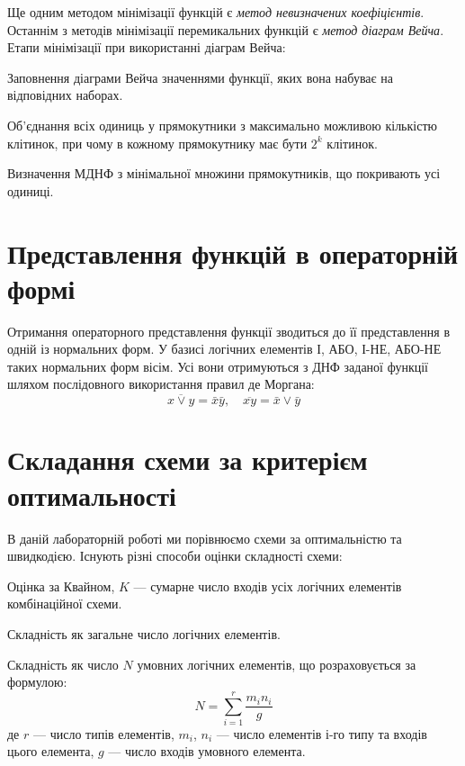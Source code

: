 \documentclass{labs}
\begin{document}
    Ще одним методом мінімізації функцій є \textit{метод невизначених
    коефіцієнтів}.
    Останнім з методів мінімізації перемикальних функцій є \textit{метод діаграм
    Вейча}.
    Етапи мінімізації при використанні діаграм Вейча:
    \begin{enumerator}
      \item Заповнення діаграми Вейча значеннями функції, яких вона набуває на
        відповідних наборах.
      \item Об’єднання всіх одиниць у прямокутники з максимально можливою
        кількістю клітинок, при чому в кожному прямокутнику має бути $2^k$
        клітинок.
      \item Визначення МДНФ з мінімальної множини прямокутників, що покривають
        усі одиниці.
    \end{enumerator}

  \section{Представлення функцій в операторній формі}
    Отримання операторного представлення функції зводиться до її представлення в
    одній із нормальних форм.
    У базисі логічних елементів І, АБО, І-НЕ, АБО-НЕ таких нормальних форм
    вісім.
    Усі вони отримуються з ДНФ заданої функції шляхом послідовного використання
    правил де Моргана:
    \begin{equation}
      \overline{x \lor y} = \bar{x}\bar{y}, \quad \overline{xy} = \bar{x}\lor\bar{y}
    \end{equation}

  \section{Складання схеми за критерієм оптимальності} 
  В даній лабораторній роботі ми порівнюємо схеми за оптимальністю та
  швидкодією.
  Існують різні способи оцінки складності схеми:
  \begin{enumerator}
    \item Оцінка за Квайном, $K$ --- сумарне число входів усіх логічних
      елементів комбінаційної схеми.
    \item Складність як загальне число логічних елементів.
    \item Складність як число $N$ умовних логічних елементів, що розраховується
      за формулою:
    \begin{equation}
      N = \sum_{i = 1}^r\frac{m_i n_i}{g}
    \end{equation}
    де $r$ --- число типів елементів, $m_i$, $n_i$ --- число елементів $і$-го
    типу та входів цього елемента, $g$ --- число входів умовного елемента.
  \end{enumerator}
\end{document}
